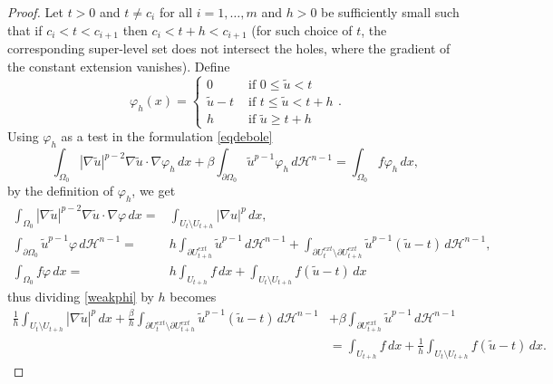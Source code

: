 \documentclass[12pt]{article}
\newcommand{\abs}[1]{{\left|#1\right|}}
\newcommand{\dH}{d\mathcal{H}^{n-1}}
\theoremstyle{definition}
\theoremstyle{plain}
\theoremstyle{definition}
\begin{document}
\begin{proof}
    Let $t>0$ and $t\neq c_i$ for all $i=1,\dots, m$ and $h>0$ be sufficiently small such that if $c_i<t<c_{i+1}$ then $c_i<t+h<c_{i+1}$ (for such choice of $t$, the corresponding super-level set does not intersect the holes, where the gradient of the constant extension vanishes). Define
    \begin{equation*}
        \varphi_h(x)=\begin{cases}
                0&\text{ if } 0\leq \tilde u<t \\
                \tilde u-t&\text{ if } t\leq \tilde u<t+h\\
                h &\text{ if }\tilde u\geq t+h
                    \end{cases}.
    \end{equation*}
    Using $\varphi_h$ as a test in the formulation \eqref{eqdebole}
    \begin{equation}\label{weakphi}
        \int_{\Omega_0}\abs{\nabla \tilde u}^{p-2}\nabla \tilde u\cdot\nabla\varphi_h\,dx+\beta\int_{\partial\Omega_0}\tilde u^{p-1}\varphi_h\,\dH=\int_{\Omega_0}f\varphi_h\,dx,
    \end{equation}
    by the definition of $\varphi_h$, we get
    \begin{equation*}
        \begin{split}
            \int_{\Omega_0}\abs{\nabla \tilde u}^{p-2}\nabla \tilde u\cdot\nabla\varphi\,dx=& \int_{U_t\setminus U_{t+h}}\abs{\nabla u}^p\,dx,\\
            \int_{\partial\Omega_0}\tilde u^{p-1}\varphi\,\dH=&h\int_{\partial U_{t+h}^{ext}}\tilde u^{p-1}\,\dH+\int_{\partial U_{t}^{ext}\setminus\partial U_{t+h}^{ext}}\tilde u^{p-1}(\tilde u-t)\,\dH,\\ \int_{\Omega_0}f\varphi\,dx=&h\int_{U_{t+h}}f\,dx+\int_{U_t\setminus U_{t+h}}f(\tilde u-t)\,dx
        \end{split}
    \end{equation*}
    thus dividing \eqref{weakphi} by $h$ becomes
    \begin{equation}\label{INVENTO}
    \begin{split}
        \frac{1}{h}\int_{U_t\setminus U_{t+h}}\abs{\nabla \tilde u}^p\,dx+\frac{\beta}{h}\int_{\partial U_{t}^{ext}\setminus\partial U_{t+h}^{ext}}\tilde u^{p-1}(\tilde u-t)\,\dH&+\beta\int_{\partial U_{t+h}^{ext}}\tilde u^{p-1}\,\dH\\
        &=\int_{U_{t+h}}f\,dx+\frac{1}{h}\int_{U_t\setminus U_{t+h}}f(\tilde u-t)\,dx.
    \end{split}

\end{equation}
\end{proof}
\end{document}
